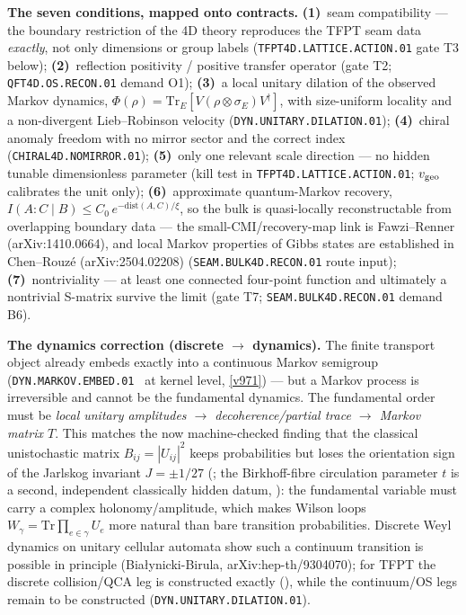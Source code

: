 \documentclass[11pt,a4paper]{article}
\begin{document}
\par\smallskip\noindent\textbf{The seven conditions, mapped onto contracts.}
\textbf{(1)}~seam compatibility --- the boundary restriction of the 4D theory reproduces the
TFPT seam data \emph{exactly}, not only dimensions or group labels
(\texttt{TFPT4D.LATTICE.ACTION.01} gate T3 below);
\textbf{(2)}~reflection positivity / positive transfer operator (gate T2;
\texttt{QFT4D.OS.RECON.01} demand O1);
\textbf{(3)}~a local unitary dilation of the observed Markov dynamics,
$\Phi(\rho)=\mathrm{Tr}_E[V(\rho\otimes\sigma_E)V^\dagger]$, with size-uniform locality and a
non-divergent Lieb--Robinson velocity (\texttt{DYN.UNITARY.DILATION.01});
\textbf{(4)}~chiral anomaly freedom with no mirror sector and the correct index
(\texttt{CHIRAL4D.NOMIRROR.01});
\textbf{(5)}~only one relevant scale direction --- no hidden tunable dimensionless parameter
(kill test in \texttt{TFPT4D.LATTICE.ACTION.01}; $v_{\rm geo}$ calibrates the unit only);
\textbf{(6)}~approximate quantum-Markov recovery,
$I(A{:}C\mid B)\le C_0\,e^{-\mathrm{dist}(A,C)/\xi}$, so the bulk is quasi-locally
reconstructable from overlapping boundary data --- the small-CMI/recovery-map link is
Fawzi--Renner (arXiv:1410.0664), and local Markov properties of Gibbs states are established in
Chen--Rouz\'e (arXiv:2504.02208) (\texttt{SEAM.BULK4D.RECON.01} route input);
\textbf{(7)}~nontriviality --- at least one connected four-point function and ultimately a
nontrivial S-matrix survive the limit (gate T7; \texttt{SEAM.BULK4D.RECON.01} demand B6).

\par\smallskip\noindent\textbf{The dynamics correction (discrete $\to$ dynamics).}  The finite
transport object already embeds exactly into a continuous Markov semigroup
(\texttt{DYN.MARKOV.EMBED.01} \mE\ at kernel level, \vref{v971}) --- but a Markov process is
irreversible and cannot be the fundamental dynamics.  The fundamental order must be
\emph{local unitary amplitudes $\to$ decoherence/partial trace $\to$ Markov matrix $T$}.  This
matches the now machine-checked finding that the classical unistochastic matrix $B_{ij}=|U_{ij}|^2$
keeps probabilities but loses the orientation sign of the Jarlskog invariant $J=\pm1/27$
(; the Birkhoff-fibre circulation parameter $t$ is a
second, independent classically hidden datum, ): the fundamental
variable must carry a complex
holonomy/amplitude, which makes Wilson loops $W_\gamma=\mathrm{Tr}\prod_{e\in\gamma}U_e$ more
natural than bare transition probabilities.  Discrete Weyl dynamics on unitary cellular automata
show such a continuum transition is possible in principle (Bia\l ynicki-Birula,
arXiv:hep-th/9304070); for TFPT the discrete collision/QCA leg is constructed exactly
(), while the continuum/OS legs remain to be constructed
(\texttt{DYN.UNITARY.DILATION.01}).
\end{document}
